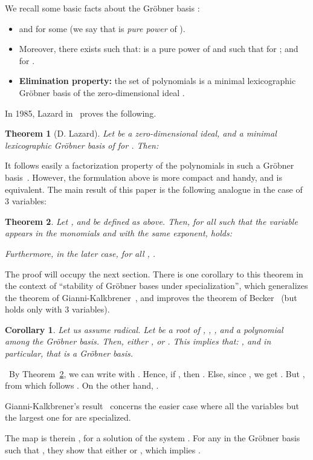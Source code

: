 \documentclass[a4paper,11pt]{article}
\newcommand{\proof}{\noindent {\sc Proof:}~}
\newcommand{\foorp}{\hfill }
\newtheorem{Theo}{Theorem}
\newtheorem{Cor}{Corollary}
\begin{document}
We recall some basic facts about the Gr\"obner basis : 
\begin{itemize}
\item   and  for some 
(we say that  is {\em pure power} of ).
\item Moreover, there exists  such that:
 is a pure power of  and
such that
 for ;
and  for .
\item {\bf Elimination property:} the set of polynomials
 is a minimal lexicographic
Gr\"obner basis of the zero-dimensional ideal .
\end{itemize}

In 1985, Lazard in~\cite{Laz85}  proves the following.
\begin{Theo}[D. Lazard]
Let  be a zero-dimensional ideal,
and  a minimal lexicographic Gr\"obner basis
of  for . Then:

\end{Theo}
It follows easily a factorization property of the polynomials
in such a Gr\"obner basis~\cite[Theorem~1~(i)]{Laz85}.
However, the formulation above
is more compact and handy, and is equivalent.
The main result of this paper is the following analogue
in the case of 3 variables:
\begin{Theo}\label{th:main}
Let ,  and   be defined as above.
Then, for all  such that the variable 
appears in the monomials  and  with the {\em same
exponent}, holds:

Furthermore, in the later case, for all , .  
\end{Theo}
The proof will occupy the next section.
There is one corollary to this theorem
in the context of ``stability of Gr\"obner bases under specialization'',
which generalizes the theorem of Gianni-Kalkbrener~\cite{Gi87,Ka87},
and improves the theorem of Becker~\cite{Be94}
(but  holds only with 3 variables).
\begin{Cor}\label{cor:main}
Let us assume   radical.
Let  be a root of ,
, ,
and  a polynomial
among the Gr\"obner basis.
Then, either , or .
This implies that: ,
and in particular, that  is a Gr\"obner basis.
\end{Cor}
\proof By Theorem~\ref{th:main},
we can write  with .
Hence, if , then .
Else, since , we get
. But ,
from which follows .
On the other hand, .
\foorp
\medskip

Gianni-Kalkbrener's result~\cite{Gi87,Ka87} concerns the easier
case where all the variables but the largest one for  are specialized.
\smallskip

The map  is therein , 
 for 
a solution of the system .
For any  in the Gr\"obner basis 
such that ,
they show that either  or
,
which implies
.
\smallskip
\end{document}
